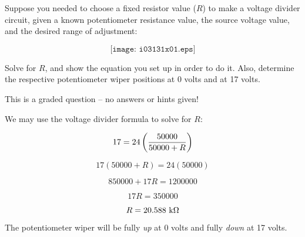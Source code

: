 

Suppose you needed to choose a fixed resistor value ($R$) to make a voltage divider circuit, given a known potentiometer resistance value, the source voltage value, and the desired range of adjustment:

$$\texttt{[image: i03131x01.eps]}$$

Solve for $R$, and show the equation you set up in order to do it.  Also, determine the respective potentiometer wiper positions at 0 volts and at 17 volts.

\vfil 

\eject






This is a graded question -- no answers or hints given!







We may use the voltage divider formula to solve for $R$:

$$17 = 24 \left(50000 \over {50000 + R} \right)$$

$$17 (50000 + R) = 24 (50000)$$

$$850000 + 17R = 1200000$$

$$17R = 350000$$

$$R = 20.588 \hbox{ k} \Omega $$

\vskip 10pt

The potentiometer wiper will be fully {\it up} at 0 volts and fully {\it down} at 17 volts.




